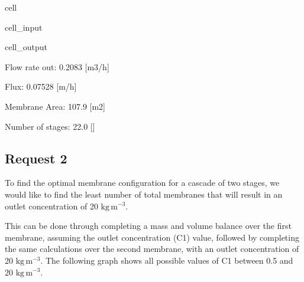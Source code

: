 \documentclass[letterpaper,10pt,english]{jupyterBook}
\begin{document}
\begin{sphinxuseclass}{cell}
\begin{sphinxVerbatimInput}
\begin{sphinxuseclass}{cell_input}
\end{sphinxuseclass}\end{sphinxVerbatimInput}
\begin{sphinxVerbatimOutput}

\begin{sphinxuseclass}{cell_output}
\begin{sphinxVerbatim}[commandchars=\\\{\}]
Flow rate out:  0.2083  [m\PYGZca{}3/h]

Flux:  0.07528  [m/h]

Membrane Area:  107.9  [m\PYGZca{}2]

Number of stages:  22.0  [\PYGZhy{}]
\end{sphinxVerbatim}

\end{sphinxuseclass}\end{sphinxVerbatimOutput}

\end{sphinxuseclass}

\subsection{Request 2}
\label{\detokenize{Exercise_W4_2024_updated:request-2}}
\sphinxAtStartPar
To find the optimal membrane configuration for a cascade of two stages, we would like to find the least number of total membranes that will result in an outlet concentration of 20 \(\mathrm{kg\,m^{-3}}\).

\sphinxAtStartPar
This can be done through completing a mass and volume balance over the first membrane, assuming the outlet concentration (C1) value, followed by completing the same calculations over the second membrane, with an outlet concentration of 20 \(\mathrm{kg\,m^{-3}}\). The following graph shows all possible values of C1 between 0.5 and 20 \(\mathrm{kg\,m^{-3}}\).
\end{document}
